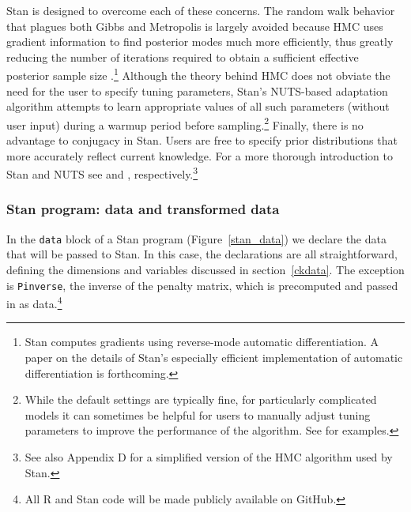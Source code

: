 Stan is designed to overcome each of these concerns. The random walk behavior that plagues both 
Gibbs and Metropolis is largely avoided because HMC uses gradient information to find posterior modes 
much more efficiently, thus greatly reducing the number of iterations required to obtain a sufficient 
effective posterior sample size .\footnote{Stan computes gradients using 
reverse-mode automatic differentiation. A paper on the details of Stan's especially efficient 
implementation of automatic differentiation is forthcoming.}  Although the theory behind HMC does 
not obviate the need for the user to specify tuning parameters, Stan's NUTS-based adaptation algorithm 
attempts to learn appropriate values of all such parameters (without user input) during a warmup 
period before sampling.\footnote{While the default settings are typically fine, for particularly complicated 
models it can sometimes be helpful for users to manually adjust tuning parameters to improve the 
performance of the algorithm. See  for examples.} 
Finally, there is no advantage to conjugacy in Stan. 
Users are free to specify prior distributions that more accurately reflect current knowledge. 
For a more thorough introduction to Stan and NUTS see  
and , respectively.\footnote{See also Appendix D %
for a simplified version of the HMC algorithm used by Stan.}

\subsubsection{Stan program: data and transformed data}

In the {\tt data} block of a Stan program (Figure~\ref{stan_data}) we declare the data that will 
be passed to Stan. In this case, the declarations are all straightforward, defining the dimensions 
and variables discussed in section~\ref{ckdata}. The exception is {\tt Pinverse}, the inverse of 
the penalty matrix, which is precomputed and passed in as data.\footnote{All R and Stan code 
will be made publicly available on GitHub.}

